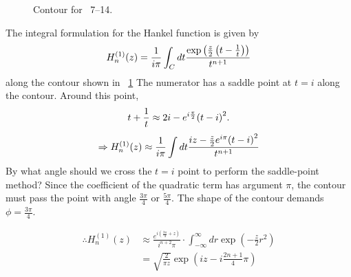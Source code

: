 \item

\begin{figure}[ht]
	\centering
	\caption{Contour for ~7--14.}%
	\label{fig:problem7-14}
\end{figure}

The integral formulation for the Hankel function is given by
\[
    H_n^{(1)}(z) = \frac{1}{i\pi} \int_C dt \frac{
        \exp\left( \frac{z}{2} \left( t - \frac{1}{t} \right) \right)
    }{t^{n + 1}}
\]
along the contour shown in ~\ref{fig:problem7-14}
The numerator has a saddle point at $t = i$ along the contour.
Around this point,
\[
    t + \frac{1}{t} \approx 2i - e^{i\frac{\pi}{2}} {(t - i)}^2.
\]
\[
    \Rightarrow H_n^{(1)}(z)
    \approx \frac{1}{i\pi} \int dt \frac{
        iz - \frac{z}{2} e^{i\pi} {(t - i)}^2
    }{t^{n + 1}}
\]
By what angle should we cross the $t = i$ point to perform the saddle-point method?
Since the coefficient of the quadratic term has argument $\pi$,
the contour must pass the point with angle $\frac{3\pi}{4}$ or $\frac{5\pi}{4}$.
The shape of the contour demands $\phi = \frac{3\pi}{4}$.

\begin{align*}
    \therefore H_n^{(1)}(z)
    &\approx \frac{e^{i\left( \frac{3\pi}{4} + z \right)}}{i^{n + 2} \pi}
     \cdot \int_{-\infty}^\infty dr \exp\left( -\frac{z}{2} r^2 \right) \\
    &= \sqrt{\frac{2}{\pi z}} \exp\left( iz - i \frac{2n + 1}{4}\pi \right)
\end{align*}
